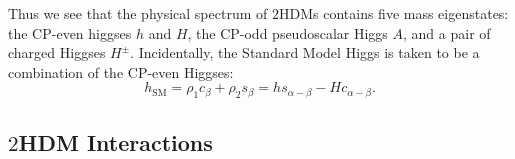 Thus we see that the physical spectrum of $2$HDMs contains five mass eigenstates: the CP-even higgses $h$ and $H$, the CP-odd pseudoscalar Higgs $A$, and a pair of charged Higgses $H^\pm$. Incidentally, the Standard Model Higgs is taken to be a combination of the CP-even Higgses:
\begin{equation}
  h_\text{SM} = \rho_1c_\beta + \rho_2s_\beta = hs_{\alpha-\beta}-Hc_{\alpha-\beta}.
\label{eq:h_SM}
\end{equation}

\subsection{$2$HDM Interactions}

\newcommand{\sbma}{s_{\beta-\alpha}}
\newcommand{\cbma}{c_{\beta-\alpha}}
\newcommand{\casb}{c_\alpha/s_\beta}
\newcommand{\sacb}{s_\alpha/c_\beta}
\newcommand{\sasb}{s_\alpha/s_\beta}

